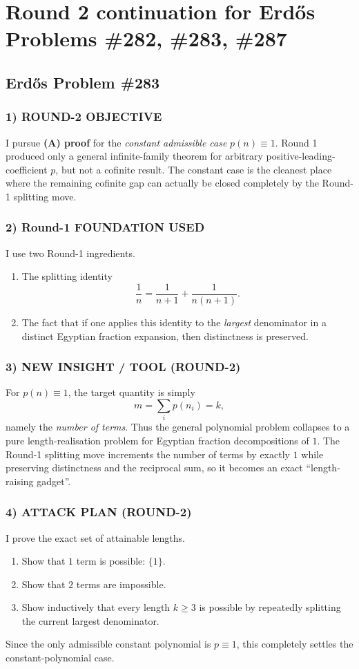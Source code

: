 \section*{Round 2 continuation for Erd\H{o}s Problems \#282, \#283, \#287}

\subsection*{Erd\H{o}s Problem \#283}

\subsubsection*{1) ROUND-2 OBJECTIVE}
I pursue \textbf{(A) proof} for the \emph{constant admissible case} $p(n)\equiv 1$. Round 1 produced only a general infinite-family theorem for arbitrary positive-leading-coefficient $p$, but not a cofinite result. The constant case is the cleanest place where the remaining cofinite gap can actually be closed completely by the Round-1 splitting move.

\subsubsection*{2) Round-1 FOUNDATION USED}
I use two Round-1 ingredients.
\begin{enumerate}
\item The splitting identity
\[
\frac1n=\frac1{n+1}+\frac1{n(n+1)}.
\]
\item The fact that if one applies this identity to the \emph{largest} denominator in a distinct Egyptian fraction expansion, then distinctness is preserved.
\end{enumerate}

\subsubsection*{3) NEW INSIGHT / TOOL (ROUND-2)}
For $p(n)\equiv 1$, the target quantity is simply
\[
 m=\sum_i p(n_i)=k,
\]
namely the \emph{number of terms}. Thus the general polynomial problem collapses to a pure length-realisation problem for Egyptian fraction decompositions of $1$. The Round-1 splitting move increments the number of terms by exactly $1$ while preserving distinctness and the reciprocal sum, so it becomes an exact ``length-raising gadget''.

\subsubsection*{4) ATTACK PLAN (ROUND-2)}
I prove the exact set of attainable lengths.
\begin{enumerate}
\item Show that $1$ term is possible: $\{1\}$.
\item Show that $2$ terms are impossible.
\item Show inductively that every length $k\ge 3$ is possible by repeatedly splitting the current largest denominator.
\end{enumerate}
Since the only admissible constant polynomial is $p\equiv 1$, this completely settles the constant-polynomial case.

